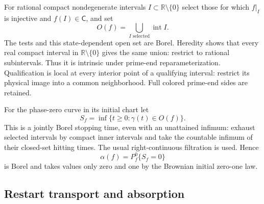 For rational compact nondegenerate intervals
$I\subset\mathbb R\setminus\{0\}$ select those for which $f|_I$
is injective and $f(I)\in\mathsf C$, and set
\[
 O(f)=\bigcup_{I\text{ selected}}\operatorname{int}I.
 \tag{OS5}
\]
The tests and this state-dependent open set are Borel.
Heredity shows that every real compact interval in
$\mathbb R\setminus\{0\}$ gives the same union: restrict to rational
subintervals. Thus it is intrinsic under prime-end
reparameterization. Qualification is local at every interior point
of a qualifying interval: restrict its physical image into a
common neighborhood. Full colored prime-end sides are retained.

For the phase-zero curve in its initial chart let
\[
 S_f=\inf\{t\ge0:\gamma(t)\in O(f)\}.
 \tag{OS6}
\]
This is a jointly Borel stopping time, even with an unattained
infimum: exhaust selected intervals by compact inner intervals and
take the countable infimum of their closed-set hitting times.
The usual right-continuous filtration is used. Hence
\[
 \alpha(f)=P^0_f\{S_f=0\}
 \tag{OS7}
\]
is Borel and takes values only zero and one by the Brownian
initial zero-one law.

\subsection{Restart transport and absorption}

